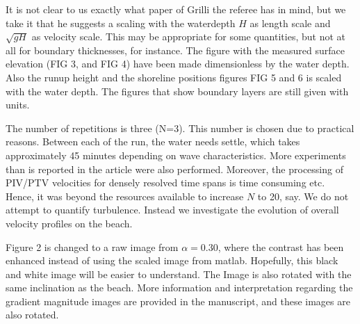 \documentclass[11pt]{article}
\begin{document}

It is not clear to us exactly what paper of Grilli the referee has in mind, but we take it that he suggests a scaling
with the waterdepth $H$ as length scale and $\sqrt{gH}$ as velocity scale. This may be appropriate for some quantities, but not at all for boundary thicknesses, for instance.
The figure with the measured surface elevation (FIG 3, and  FIG 4) have been  made dimensionless  by the water depth. Also the runup height and the shoreline positions figures FIG 5 and 6 is scaled with the water depth. The figures that show boundary layers are still given with units. 

The number of repetitions is three (N=3). This number is chosen due to practical reasons. Between each of the run, the water needs settle, which takes approximately 45 minutes depending on wave characteristics. More experiments than is reported in the article were also performed. Moreover, the processing of PIV/PTV velocities for densely resolved time spans is time consuming etc. Hence, it was beyond the resources available to increase $N$ to 20, say.  
We do not attempt to quantify turbulence. Instead we investigate the evolution of overall velocity profiles on the beach.


Figure 2 is changed to a raw image from $\alpha=0.30$, where the contrast has been enhanced instead of using the scaled image from matlab. Hopefully, this black and white image will be easier to understand. The Image is also rotated with the same inclination as the beach. More information and interpretation regarding the gradient magnitude images are provided in the manuscript, and these images are also rotated.
\end{document}
